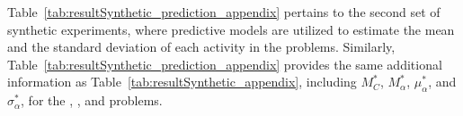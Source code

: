 Table~\ref{tab:resultSynthetic_prediction_appendix} pertains to the second set of synthetic experiments, where predictive models are utilized to estimate the mean and the standard deviation of each activity in the problems. Similarly, Table~\ref{tab:resultSynthetic_prediction_appendix} provides the same additional information as Table~\ref{tab:resultSynthetic_appendix}, including $M^*_{C}$, $M^*_{\alpha}$, $\mu^*_{\alpha}$, and $\sigma^*_{\alpha}$, for the , , and  problems.



